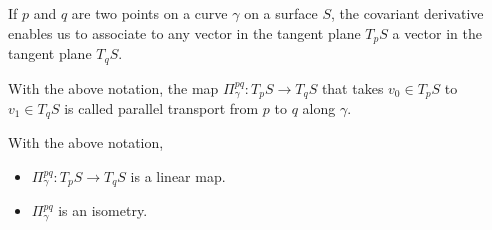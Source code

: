 If $p$ and $q$ are two points on a curve $\gamma$ on a surface $S$,
the covariant derivative enables us to associate to any vector in the
tangent plane $T_p S$ a vector in the tangent plane $T_q S$.

\begin{defn}
  With the above notation, the map
  $\Pi_{\gamma}^{pq}: T_p S \to T_q S$ that takes
  $v_0 \in T_p S$ to $v_1 \in T_q S$ is called
  parallel transport from $p$ to $q$ along $\gamma$.
\end{defn}

\begin{proposition}
  With the above notation,
  \begin{itemize}
    \item $\Pi_{\gamma}^{pq}: T_p S \to T_q S$ is a linear map.
    \item $\Pi_{\gamma}^{pq}$ is an isometry.
  \end{itemize}
\end{proposition}